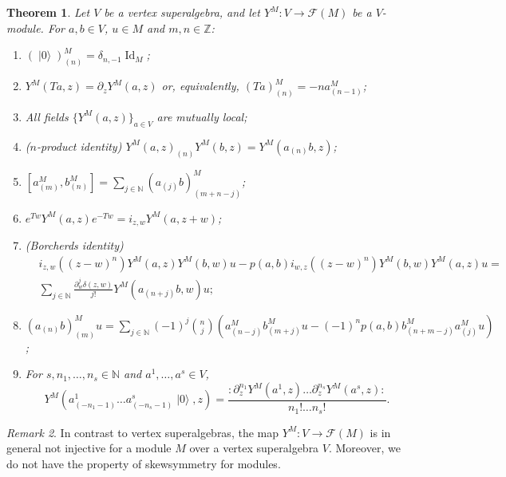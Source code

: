 \documentclass[a4paper, 12pt, reqno]{amsart}
\newtheorem{theorem}{Theorem}[section]
\theoremstyle{remark}
\newtheorem{remark}[theorem]{Remark}
\DeclareMathOperator{\Id}{Id}
\DeclareMathOperator{\vac}{|0\rangle}
\begin{document}
\begin{theorem}
  \label{thr:24}
  Let $V$ be a vertex superalgebra, and let $Y^M: V \to \mathcal{F}(M)$ be a $V$-module.
  For $a, b \in V$, $u \in M$ and $m, n \in \mathbb{Z}$:
  \begin{enumerate}
  \item $(\vac)^M_{(n)} = \delta_{n, -1}\Id_M$;
  \item $Y^M(Ta, z) = \partial_zY^M(a, z)$ or, equivalently, $(Ta)^M_{(n)} = -na^M_{(n - 1)}$;
  \item All fields $\{Y^M(a, z)\}_{a \in V}$ are mutually local;
  \item \emph{($n$-product identity)} $Y^M(a, z)_{(n)}Y^M(b, z) = Y^M(a_{(n)}b, z)$;
  \item $[a^M_{(m)}, b^M_{(n)}] = \sum_{j \in \mathbb{N}}(a_{(j)}b)^M_{(m + n - j)}$;
  \item $e^{Tw}Y^M(a, z)e^{-Tw} = i_{z, w}Y^M(a, z + w)$;
  \item \emph{(Borcherds identity)}
    \begin{equation*}
      \begin{split}
        &i_{z, w}((z - w)^n)Y^M(a, z)Y^M(b, w)u - p(a, b)i_{w, z}((z - w)^n)Y^M(b, w)Y^M(a, z)u = \\
        &\sum_{j \in \mathbb{N}}\frac{\partial^j_w\delta(z, w)}{j!}Y^M(a_{(n + j)}b, w)u;
      \end{split}
    \end{equation*}
  \item $(a_{(n)}b)^M_{(m)}u = \sum_{j \in \mathbb{N}}(-1)^j\binom{n}{j}(a^M_{(n - j)}b^M_{(m + j)}u - (-1)^np(a, b)b^M_{(n + m - j)}a^M_{(j)}u)$;
  \item For $s, n_1, \dots, n_s \in \mathbb{N}$ and $a^1, \dots, a^s \in V$,
    \begin{equation*}
      Y^M(a^1_{(-n_1 - 1)}\dots a^s_{(-n_s - 1)}\vac, z) = \frac{:\partial^{n_1}_zY^M(a^1, z)\dots\partial^{n_s}_zY^M(a^s, z):}{n_1!\dots n_s!}.
    \end{equation*}
  \end{enumerate}
\end{theorem}

\begin{remark}
  \label{rmk:22}
  In contrast to vertex superalgebras, the map $Y^M: V \to \mathcal{F}(M)$ is in general not injective for a module $M$ over a vertex superalgebra $V$.
  Moreover, we do not have the property of skewsymmetry for modules.
\end{remark}
\end{document}
